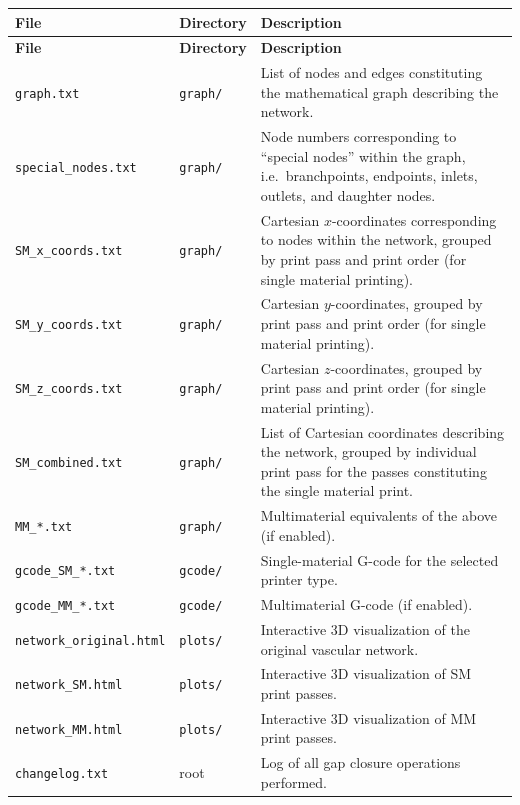 \documentclass[11pt,letterpaper]{article}
\newcommand{\code}[1]{\texttt{#1}}
\begin{document}
\begin{longtable}{L{4cm} L{2cm} L{8cm}}
\toprule
\textbf{File} & \textbf{Directory} & \textbf{Description} \\
\midrule
\endfirsthead
\toprule
\textbf{File} & \textbf{Directory} & \textbf{Description} \\
\midrule
\endhead
\code{graph.txt} & \code{graph/} & List of nodes and edges constituting the mathematical graph describing the network. \\
\code{special\_nodes.txt} & \code{graph/} & Node numbers corresponding to ``special nodes'' within the graph, i.e.\ branchpoints, endpoints, inlets, outlets, and daughter nodes. \\
\code{SM\_x\_coords.txt} & \code{graph/} & Cartesian $x$-coordinates corresponding to nodes within the network, grouped by print pass and print order (for single material printing). \\
\code{SM\_y\_coords.txt} & \code{graph/} & Cartesian $y$-coordinates, grouped by print pass and print order (for single material printing). \\
\code{SM\_z\_coords.txt} & \code{graph/} & Cartesian $z$-coordinates, grouped by print pass and print order (for single material printing). \\
\code{SM\_combined.txt} & \code{graph/} & List of Cartesian coordinates describing the network, grouped by individual print pass for the passes constituting the single material print. \\
\code{MM\_*.txt} & \code{graph/} & Multimaterial equivalents of the above (if enabled). \\
\code{gcode\_SM\_*.txt} & \code{gcode/} & Single-material G-code for the selected printer type. \\
\code{gcode\_MM\_*.txt} & \code{gcode/} & Multimaterial G-code (if enabled). \\
\code{network\_original.html} & \code{plots/} & Interactive 3D visualization of the original vascular network. \\
\code{network\_SM.html} & \code{plots/} & Interactive 3D visualization of SM print passes. \\
\code{network\_MM.html} & \code{plots/} & Interactive 3D visualization of MM print passes. \\
\code{changelog.txt} & root & Log of all gap closure operations performed. \\
\bottomrule
\end{longtable}
\end{document}
